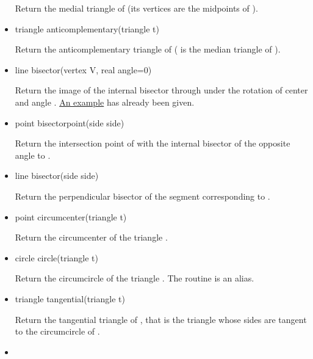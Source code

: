 \documentclass[pdftex]{article}
\begin{document}
\begin{itemize}
  Return the medial triangle of  (its vertices are the
  midpoints of ).
\item {}
  \begin{Vcolor}
    triangle anticomplementary(triangle t)
  \end{Vcolor}
  Return the anticomplementary triangle of  ( is
  the median triangle of ).
\item {}
  \begin{Vcolor}
    line bisector(vertex V, real angle=0)
  \end{Vcolor}
  Return the image of the internal bisector through 
  under the rotation of center  and angle . \href{#bisectorvertex}{An
  example} has already been given.
\item {}
  \begin{Vcolor}
    point bisectorpoint(side side)
  \end{Vcolor}
  Return the intersection point of  with the internal bisector of the
   opposite angle to .
\item {}
  \begin{Vcolor}
    line bisector(side side)
  \end{Vcolor}
  Return the perpendicular bisector of the segment corresponding to .
\item {}
  \begin{Vcolor}
    point circumcenter(triangle t)
  \end{Vcolor}
  Return the circumcenter of the triangle .
\item {}
  \begin{Vcolor}
    circle circle(triangle t)
  \end{Vcolor}
  Return the circumcircle of the triangle . The routine
   is an alias.
\item {}
  \begin{Vcolor}
    triangle tangential(triangle t)
  \end{Vcolor}
  Return the tangential triangle of , that is the triangle
  whose sides are tangent to the circumcircle of .
\item {}

\end{itemize}
\end{document}
